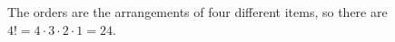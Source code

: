 The orders are the arrangements of four different items, so there are $4!=4\cdot3\cdot2\cdot1=\boxed{24}$.
